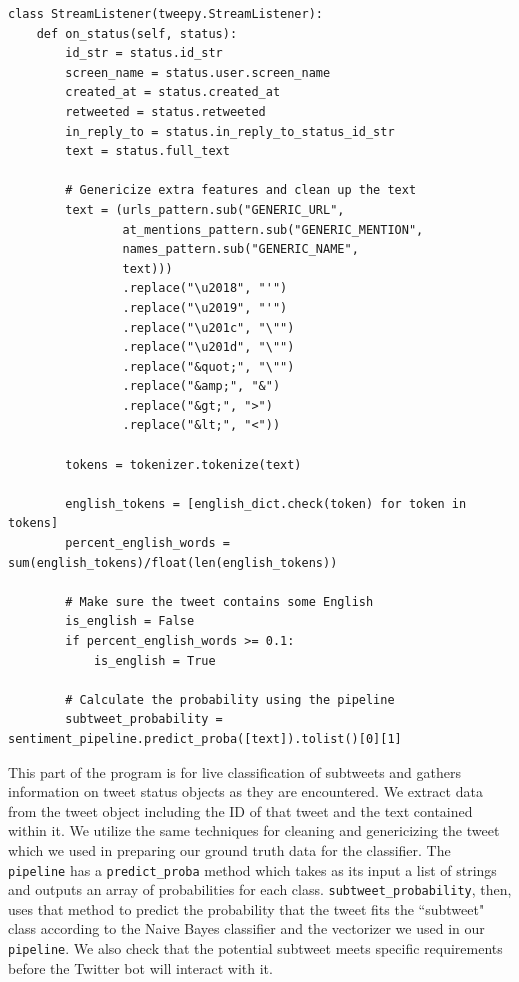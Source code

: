 \documentclass[11pt, twoside, reqno]{book}
\begin{document}
\begin{verbatim}
class StreamListener(tweepy.StreamListener):
    def on_status(self, status):
        id_str = status.id_str
        screen_name = status.user.screen_name
        created_at = status.created_at
        retweeted = status.retweeted
        in_reply_to = status.in_reply_to_status_id_str
        text = status.full_text

        # Genericize extra features and clean up the text
        text = (urls_pattern.sub("GENERIC_URL",
                at_mentions_pattern.sub("GENERIC_MENTION",
                names_pattern.sub("GENERIC_NAME",
                text)))
                .replace("\u2018", "'")
                .replace("\u2019", "'")
                .replace("\u201c", "\"")
                .replace("\u201d", "\"")
                .replace("&quot;", "\"")
                .replace("&amp;", "&")
                .replace("&gt;", ">")
                .replace("&lt;", "<"))

        tokens = tokenizer.tokenize(text)

        english_tokens = [english_dict.check(token) for token in tokens]
        percent_english_words = sum(english_tokens)/float(len(english_tokens))

        # Make sure the tweet contains some English
        is_english = False
        if percent_english_words >= 0.1:
            is_english = True

        # Calculate the probability using the pipeline
        subtweet_probability = sentiment_pipeline.predict_proba([text]).tolist()[0][1]
\end{verbatim}

\noindent
This part of the program is for live classification of subtweets and gathers information on tweet status objects as they are encountered. We extract data from the tweet object including the ID of that tweet and the text contained within it. We utilize the same techniques for cleaning and genericizing the tweet which we used in preparing our ground truth data for the classifier. The \verb|pipeline| has a \verb|predict_proba| method which takes as its input a list of strings and outputs an array of probabilities for each class. \verb|subtweet_probability|, then, uses that method to predict the probability that the tweet fits the ``subtweet" class according to the Naive Bayes classifier and the vectorizer we used in our \verb|pipeline|. We also check that the potential subtweet meets specific requirements before the Twitter bot will interact with it.
\end{document}
